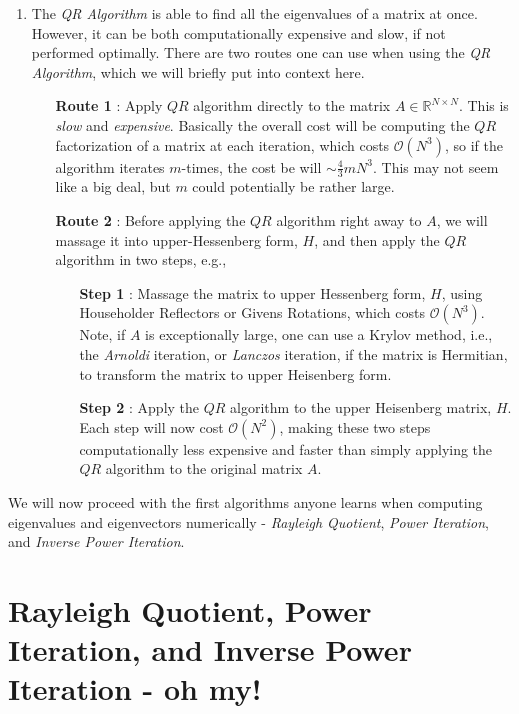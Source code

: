 \documentclass[paper=a4, fontsize=11pt]{scrartcl} %
\numberwithin{equation}{section} %
\numberwithin{figure}{section} %
\numberwithin{table}{section} %
\begin{document}
\begin{enumerate}
\item The \emph{QR Algorithm} is able to find all the eigenvalues of a matrix at once. However, it can be both computationally expensive and slow, if not performed optimally. There are two routes one can use when using the \emph{QR Algorithm}, which we will briefly put into context here. 
\begin{itemize}
\item[\textbf{Route 1}]: Apply $QR$ algorithm directly to the matrix $A\in\mathbb{R}^{N\times N}$. This is \emph{slow} and \emph{expensive}. Basically the overall cost will be computing the $QR$ factorization of a matrix at each iteration, which costs $\mathcal{O}(N^3)$, so if the algorithm iterates $m$-times, the cost be will $\sim \frac{4}{3}mN^3$. This may not seem like a big deal, but $m$ could potentially be rather large.  
\item[\textbf{Route 2}]: Before applying the $QR$ algorithm right away to $A$, we will massage it into upper-Hessenberg form, $H$, and then apply the $QR$ algorithm in two steps, e.g., 
\begin{itemize}
\item[\textbf{Step 1}]: Massage the matrix to upper Hessenberg form, $H$, using Householder Reflectors or Givens Rotations, which costs $\mathcal{O}(N^3)$. Note, if $A$ is exceptionally large, one can use a Krylov method, i.e., the \emph{Arnoldi} iteration, or \emph{Lanczos} iteration, if the matrix is Hermitian, to transform the matrix to upper Heisenberg form.  
\item[\textbf{Step 2}]: Apply the $QR$ algorithm to the upper Heisenberg matrix, $H$. Each step will now cost $\mathcal{O}(N^2)$, making these two steps computationally less expensive and faster than simply applying the $QR$ algorithm to the original matrix $A$. 
\end{itemize}
\end{itemize}

\end{enumerate}



We will now proceed with the first algorithms anyone learns when computing eigenvalues and eigenvectors numerically - \emph{Rayleigh Quotient}, \emph{Power Iteration}, and \emph{Inverse Power Iteration}.


%
%

\section{Rayleigh Quotient, Power Iteration, and Inverse Power Iteration - oh my!}
\end{document}
